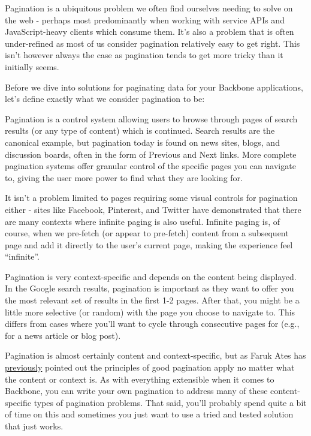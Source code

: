 \documentclass[9pt]{book}
\begin{document}
Pagination is a ubiquitous problem we often find ourselves needing to
solve on the web - perhaps most predominantly when working with service
APIs and JavaScript-heavy clients which consume them. It's also a
problem that is often under-refined as most of us consider pagination
relatively easy to get right. This isn't however always the case as
pagination tends to get more tricky than it initially seems.

Before we dive into solutions for paginating data for your Backbone
applications, let's define exactly what we consider pagination to be:

Pagination is a control system allowing users to browse through pages of
search results (or any type of content) which is continued. Search
results are the canonical example, but pagination today is found on news
sites, blogs, and discussion boards, often in the form of Previous and
Next links. More complete pagination systems offer granular control of
the specific pages you can navigate to, giving the user more power to
find what they are looking for.

It isn't a problem limited to pages requiring some visual controls for
pagination either - sites like Facebook, Pinterest, and Twitter have
demonstrated that there are many contexts where infinite paging is also
useful. Infinite paging is, of course, when we pre-fetch (or appear to
pre-fetch) content from a subsequent page and add it directly to the
user's current page, making the experience feel ``infinite''.

Pagination is very context-specific and depends on the content being
displayed. In the Google search results, pagination is important as they
want to offer you the most relevant set of results in the first 1-2
pages. After that, you might be a little more selective (or random) with
the page you choose to navigate to. This differs from cases where you'll
want to cycle through consecutive pages for (e.g., for a news article or
blog post).

Pagination is almost certainly content and context-specific, but as
Faruk Ates has \href{https://gist.github.com/mislav/622561}{previously}
pointed out the principles of good pagination apply no matter what the
content or context is. As with everything extensible when it comes to
Backbone, you can write your own pagination to address many of these
content-specific types of pagination problems. That said, you'll
probably spend quite a bit of time on this and sometimes you just want
to use a tried and tested solution that just works.
\end{document}
